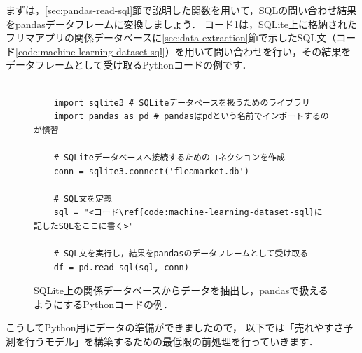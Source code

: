 まずは，\ref{sec:pandas-read-sql}節で説明した関数を用いて，SQLの問い合わせ結果をpandasデータフレームに変換しましょう．
コード\ref{code:read_sql}は，SQLite上に格納されたフリマアプリの関係データベースに\ref{sec:data-extraction}節で示したSQL文（コード\ref{code:machine-learning-dataset-sql}）を用いて問い合わせを行い，その結果をデータフレームとして受け取るPythonコードの例です．
\begin{figure}[!htbp]
    \begin{verbatim}

    import sqlite3 # SQLiteデータベースを扱うためのライブラリ
    import pandas as pd # pandasはpdという名前でインポートするのが慣習

    # SQLiteデータベースへ接続するためのコネクションを作成
    conn = sqlite3.connect('fleamarket.db')

    # SQL文を定義
    sql = "<コード\ref{code:machine-learning-dataset-sql}に記したSQLをここに書く>"

    # SQL文を実行し，結果をpandasのデータフレームとして受け取る
    df = pd.read_sql(sql, conn)

    \end{verbatim}
    \captionsetup{name=コード}
    \caption{SQLite上の関係データベースからデータを抽出し，pandasで扱えるようにするPythonコードの例．}
    \label{code:read_sql}
\end{figure}



こうしてPython用にデータの準備ができましたので，
以下では「売れやすさ予測を行うモデル」を構築するための最低限の前処理を行っていきます．


